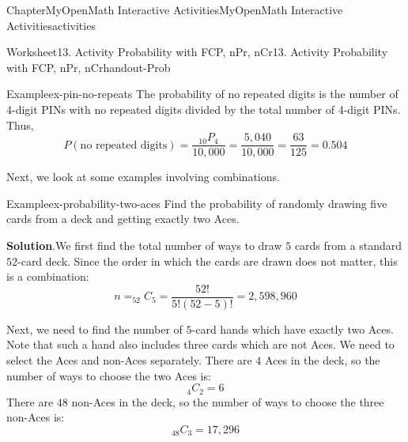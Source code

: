\documentclass[oneside,10pt,]{book}
\newcommand{\blocktitlefont}{\relax}
\newcommand{\ptxlistdisc}{\raisebox{0.3ex}{\textbullet}}
\newlength{\fillinmaxwidth}
\newlength{\fillincontract}
\newlength{\charmaxwidth}\setlength{\charmaxwidth}{0.5em}
\newlength{\charminwidth}\setlength{\charminwidth}{0.1em}
\newlength{\fillinheight}
\newcommand{\fillintext}[1]{%
\setlength{\fillinmaxwidth}{#1\charmaxwidth}%
\setlength{\fillincontract}{#1\charminwidth}%
\setlength{\fillinheight}{\baselineskip}\addtolength{\fillinheight}{1.2pt}%
\strut\nobreak\leaders\vbox{\hrule width 0.3pt height 0.3pt \vskip -1.2pt}\hskip 1\fillinmaxwidth minus \fillincontract\nobreak\strut%
}
\begin{document}
\begin{chapterptx}{Chapter}{MyOpenMath Interactive Activities}{}{MyOpenMath Interactive Activities}{}{}{activities}
\begin{worksheet-section}{Worksheet}{13. Activity Probability with FCP, nPr, nCr}{}{13. Activity Probability with FCP, nPr, nCr}{}{}{handout-Prob}
\begin{example}{Example}{}{ex-pin-no-repeats}
The probability of no repeated digits is the number of 4-digit PINs with no repeated digits divided by the total number of 4-digit PINs. Thus,%
\begin{equation*}
P(\text{no repeated digits}) = \frac{_{10}P_{4}}{10,000} = \frac{5,040}{10,000} = \frac{63}{125} = 0.504
\end{equation*}
%
\end{example}
%
\clearpage
Next, we look at some examples involving combinations.%
\begin{example}{Example}{}{ex-probability-two-aces}%
Find the probability of randomly drawing five cards from a deck and getting exactly two Aces.%
\par\smallskip%
\noindent\textbf{\blocktitlefont Solution}.\hypertarget{ex-probability-two-aces-2}{}\quad{}We first find the total number of ways to draw \(5\) cards from a standard \(52\)-card deck. Since the order in which the cards are drawn does not matter, this is a combination:%
\begin{equation*}
n = _{52}C_{5} = \frac{52!}{5!(52-5)!} = 2,598,960
\end{equation*}
%
\par
Next, we need to find the number of \(5\)-card hands which have exactly two Aces. Note that such a hand also includes three cards which are not Aces. We need to select the Aces and non-Aces separately. There are \(4\) Aces in the deck, so the number of ways to choose the two Aces is:%
\begin{equation*}
_{4}C_{2} = 6
\end{equation*}
There are \(48\) non-Aces in the deck, so the number of ways to choose the three non-Aces is:%
\begin{equation*}
_{48}C_{3} = 17,296

\end{equation*}
\end{example}
\end{worksheet-section}
\end{chapterptx}
\end{document}
